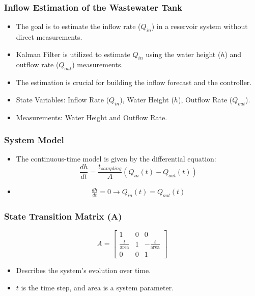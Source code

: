 \documentclass[aspectratio=169,hyperref={pdfpagelabels=false}]{beamer}
\begin{document}
\begin{frame}
  \frametitle{Inflow Estimation of the Wastewater Tank}
      \begin{itemize}
          \item The goal is to estimate the inflow rate (\(Q_{in}\)) in a reservoir system without direct measurements.
          \item Kalman Filter is utilized to estimate \(Q_{in}\) using the water height (\(h\)) and outflow rate (\(Q_{out}\)) measurements.
          \item The estimation is crucial for building the inflow forecast and the controller.
          \item State Variables: Inflow Rate (\(Q_{in}\)), Water Height (\(h\)), Outflow Rate (\(Q_{out}\)).
          \item Measurements: Water Height and Outflow Rate.
      \end{itemize}
  \end{frame}
  
  \begin{frame}
    \frametitle{System Model}
        \begin{itemize}
            \item The continuous-time model is given by the differential equation:
            \[ \frac{dh}{dt} = \frac{t_{sampling}}{A} (Q_{in}(t) - Q_{out}(t)) \]
            \item             
            \begin{align*}
              \frac{dh}{dt} = 0 \longrightarrow  Q_{in}(t) = Q_{out}(t)
            \end{align*}
        \end{itemize}
    \end{frame}

  \begin{frame}
  \frametitle{State Transition Matrix (A)}
      \[ A = \begin{bmatrix} 1 & 0 & 0 \\ \frac{t}{\text{area}} & 1 & -\frac{t}{\text{area}} \\ 0 & 0 & 1 \end{bmatrix} \]
      \begin{itemize}
          \item Describes the system's evolution over time.
          \item \(t\) is the time step, and \(\text{area}\) is a system parameter.
      \end{itemize}
  \end{frame}
  
\end{document}
